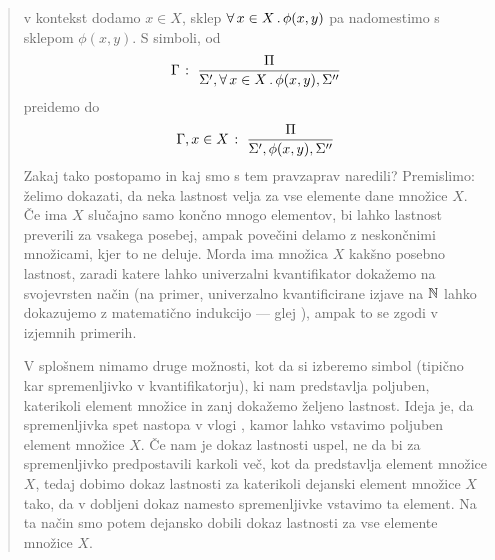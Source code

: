 \begin{itemize}
\begin{itemize}
                                        \begin{quote}
                                                v kontekst dodamo $x \in X$, sklep $\xall{x}[X]{\phi(x, y)}$ pa nadomestimo s sklepom $\phi(x, y)$. S simboli, od
                                                \[\claim{\Gamma}{\Pi}{\Sigma', \xall{x}[X]{\phi(x, y)}, \Sigma''}\]
                                                preidemo do
                                                \[{\Gamma, x \in X} \;\colon\; \frac{\Pi}{\Sigma', \phi(x, y), \Sigma''}\]
                                                Zakaj tako postopamo in kaj smo s tem pravzaprav naredili? Premislimo: želimo dokazati, da neka lastnost velja za vse elemente dane množice $X$. Če ima $X$ slučajno samo končno mnogo elementov, bi lahko lastnost preverili za vsakega posebej, ampak povečini delamo z neskončnimi množicami, kjer to ne deluje. Morda ima množica $X$ kakšno posebno lastnost, zaradi katere lahko univerzalni kvantifikator dokažemo na svojevrsten način (na primer, univerzalno kvantificirane izjave na $\mathbb{N}$ lahko dokazujemo z matematično indukcijo --- glej ), ampak to se zgodi v izjemnih primerih.

                                                V splošnem nimamo druge možnosti, kot da si izberemo simbol (tipično kar spremenljivko v kvantifikatorju), ki nam predstavlja poljuben, katerikoli element množice in zanj dokažemo željeno lastnost. Ideja je, da spremenljivka spet nastopa v vlogi , kamor lahko vstavimo poljuben element množice $X$. Če nam je dokaz lastnosti uspel, ne da bi za spremenljivko predpostavili karkoli več, kot da predstavlja element množice $X$, tedaj dobimo dokaz lastnosti za katerikoli dejanski element množice $X$ tako, da v dobljeni dokaz namesto spremenljivke vstavimo ta element. Na ta način smo potem dejansko dobili dokaz lastnosti za vse elemente množice $X$.


\end{quote}
\end{itemize}
\end{itemize}
